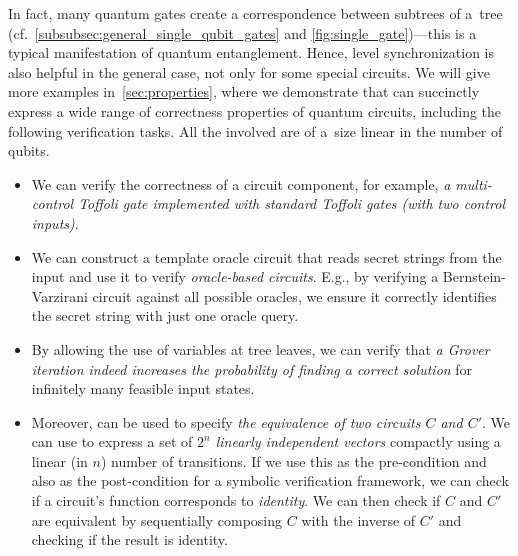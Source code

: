 In fact, many quantum gates create a correspondence between subtrees of a~tree
(cf.~\cref{subsubsec:general_single_qubit_gates} and
\cref{fig:single_gate})---this is a typical manifestation of quantum entanglement.
Hence, level synchronization is also helpful in the general case, not only for
some special circuits.
We will give more examples in~\cref{sec:properties}, where we demonstrate that \lstas can succinctly express a wide range of correctness properties of quantum
circuits, including the following verification tasks. All the involved \lstas
are of a~size linear in the number of qubits.
%
\begin{itemize}
    \item We can verify the correctness of a circuit component, for example,
      \emph{a multi-control Toffoli gate implemented with standard Toffoli
      gates (with two control inputs)}.
    \item We can construct a template oracle circuit that reads secret strings from the input and use it to verify \emph{oracle-based circuits}. E.g., by verifying a Bernstein-Varzirani circuit against all possible oracles, we ensure it correctly identifies the secret string with just one oracle query.
    \item By allowing the use of variables at tree leaves, we can verify that \emph{a Grover iteration indeed increases the probability of finding a correct solution} for infinitely many feasible input states.
    \item Moreover, \lstas can be used to specify \emph{the equivalence of two
      circuits $C$ and $C'$}. We can use \lstas to express a set of \emph{$2^n$
      linearly independent vectors} compactly using a linear (in $n$) number of
      transitions. If we use this \lsta as the pre-condition and also as the post-condition for a symbolic
      verification framework, we can check if a circuit's function corresponds
      to \emph{identity}. We can then check if $C$ and $C'$ are equivalent by
      sequentially composing $C$ with the inverse of  $C'$ and checking if the
      result is identity.
\end{itemize}

